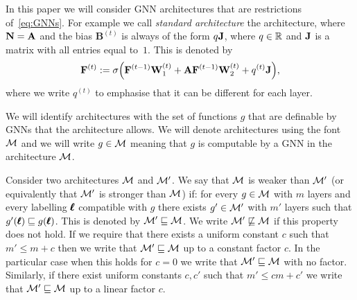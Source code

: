 In this paper we will consider GNN architectures that are restrictions of~\eqref{eq:GNNs}. For example we call \emph{standard architecture} the architecture, where $\mathbf{N} = \mathbf{A}$ and the bias $\mathbf{B}^{(t)}$ is always of the form $q \mathbf{J}$, where $q \in \mathbb{R}$ and $\mathbf{J}$ is a matrix with all entries equal to~$1$. This is denoted by
\begin{equation}
\mathbf{F}^{(t)}:=\sigma\Bigl(\mathbf{F}^{(t-1)}\mathbf{W}_1^{(t)}+ \mathbf{A}\mathbf{F}^{(t-1)}\mathbf{W}_2^{(t)} + q^{(t)} \mathbf{J} \Bigr), \label{eq:groheGNN}
\end{equation}
where we write $q^{(t)}$ to emphasise that it can be different for each layer.

We will identify architectures with the set of functions $g$ that are definable by GNNs that the architecture allows. 
We will denote architectures using the font $\mathcal{M}$ and we will write $g \in \mathcal{M}$ meaning that $g$ is computable by a GNN in the architecture $\mathcal{M}$.


\begin{definition}\label{def:comparing}
Consider two architectures $\mathcal{M}$ and $\mathcal{M}'$. We say that $\mathcal{M}$ is weaker than $\mathcal{M}'$ (or equivalently that $\mathcal{M}'$ is stronger than $\mathcal{M}$) if: for every $g \in \mathcal{M}$ with $m$ layers and every labelling $\pmb{\ell}$ compatible with $g$ there exists $g' \in \mathcal{M}'$ with $m'$ layers such that $g'(\pmb{\ell}) \sqsubseteq g(\pmb{\ell})$.
This is denoted by $\mathcal{M}' \sqsubseteq \mathcal{M}$. We write $\mathcal{M}' \not \sqsubseteq \mathcal{M}$ if this property does not hold.
If we require that there exists a uniform constant $c$ such that $m' \le m + c$ then we write that $\mathcal{M}' \sqsubseteq \mathcal{M}$ up to a constant factor $c$. In the particular case when this holds for $c = 0$ we write that $\mathcal{M}' \sqsubseteq \mathcal{M}$ with no factor. Similarly, if there exist uniform constants $c, c'$ such that $m' \le cm + c'$ we write that $\mathcal{M}' \sqsubseteq \mathcal{M}$ up to a linear factor $c$.
\end{definition}

